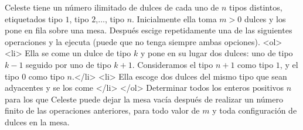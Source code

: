 Celeste tiene un número ilimitado de dulces de cada uno de $n$ tipos distintos, etiquetados tipo $1$, tipo $2$,$\dots$, tipo $n$. Inicialmente ella toma $m\gt 0$ dulces y los pone en fila sobre una mesa. Después escige repetidamente una de las siguientes operaciones y la ejecuta (puede que no tenga siempre ambas opciones).
<ol>
<li> Ella se come un dulce de tipo $k$ y pone en su lugar dos dulces: uno de tipo $k-1$ seguido por uno de tipo $k+1$. Consideramos el tipo $n+1$ como tipo $1$, y el tipo $0$ como tipo $n$.</li>
<li> Ella escoge dos dulces del mismo tipo que sean adyacentes y se los come </li>
</ol>
Determinar todos los enteros positivos $n$ para los que Celeste puede dejar la mesa vacía después de realizar un número finito de las operaciones anteriores, para todo valor de $m$ y toda configuración de dulces en la mesa.
